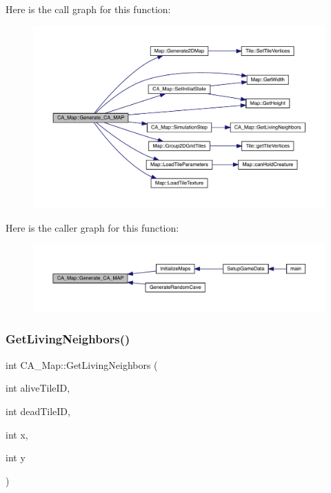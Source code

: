 Here is the call graph for this function\+:
\nopagebreak
\begin{figure}[H]
\begin{center}
\leavevmode
\includegraphics[width=350pt]{df/dfe/class_c_a___map_a8db5cbcb8cef56f0ac58571425502b59_cgraph}
\end{center}
\end{figure}
Here is the caller graph for this function\+:
\nopagebreak
\begin{figure}[H]
\begin{center}
\leavevmode
\includegraphics[width=350pt]{df/dfe/class_c_a___map_a8db5cbcb8cef56f0ac58571425502b59_icgraph}
\end{center}
\end{figure}
\mbox{\label{class_c_a___map_ad57529f17a77b590fe93839c4b8bd5f9}} 
\subsubsection{\texorpdfstring{Get\+Living\+Neighbors()}{GetLivingNeighbors()}}
{\footnotesize\ttfamily int C\+A\+\_\+\+Map\+::\+Get\+Living\+Neighbors (\begin{DoxyParamCaption}\item[{int}]{alive\+Tile\+ID,  }\item[{int}]{dead\+Tile\+ID,  }\item[{int}]{x,  }\item[{int}]{y }\end{DoxyParamCaption})}

